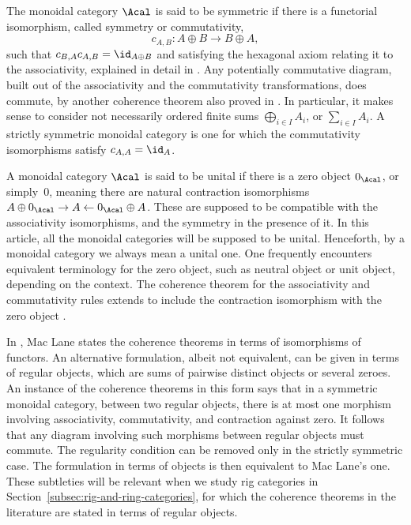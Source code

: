 The monoidal category $\Acal$ is said to be symmetric if there is a functorial isomorphism, called symmetry or commutativity,
\begin{displaymath}
c_{A,B}: A\oplus B \to B \oplus A,
\end{displaymath}
such that $c_{B,A}c_{A,B} = \id_{A\oplus B}$ and satisfying the hexagonal axiom relating it to the associativity, explained in detail in \cite[p.\,38]{MacLane}. Any potentially commutative diagram, built out of the associativity and the commutativity transformations, does commute, by another coherence theorem also proved in \cite[Th.\,4.2]{MacLane}. In particular, it makes sense to consider not necessarily ordered finite sums $\bigoplus_{i \in I} A_i$, or $\sum_{i\in I}A_{i}$. A strictly symmetric monoidal category is one for which the commutativity isomorphisms satisfy $c_{A,A}=\id_{A}$.

A monoidal category $\Acal$ is said to be unital if there is a zero object $0_{\Acal}$, or simply~$0$, meaning there are natural contraction isomorphisms $A\oplus 0_{\Acal} \rightarrow A \leftarrow 0_{\Acal} \oplus A$. These are supposed to be compatible with the associativity isomorphisms, and the symmetry in the presence of it. In this article, all the monoidal categories will be supposed to be unital. Henceforth, by a monoidal category we always mean a unital one. One frequently encounters equivalent terminology for the zero object, such as neutral object or unit object, depending on the context. The coherence theorem for the associativity and commutativity rules extends to include the contraction isomorphism with the zero object \cite[Th.\,5.1]{MacLane}.

\begin{remark}\label{rmk:Maclane-strict}
In \cite{MacLane}, Mac Lane states the coherence theorems in terms of isomorphisms of functors. An alternative formulation, albeit not equivalent, can be given in terms of regular objects, \ie which are sums of pairwise distinct objects or several zeroes. An instance of the coherence theorems in this form says that in a symmetric monoidal category, between two regular objects, there is at most one morphism involving associativity, commutativity, and contraction against zero. It follows that any diagram involving such morphisms between regular objects must commute. The regularity condition can be removed only in the strictly symmetric case. The formulation in terms of objects is then equivalent to Mac Lane's one. These subtleties will be relevant when we study rig categories in Section~\ref{subsec:rig-and-ring-categories}, for which the coherence theorems in the literature are stated in terms of regular objects.
\end{remark}

